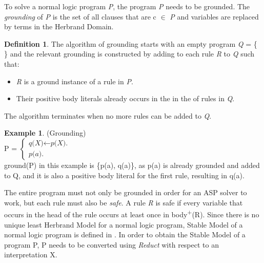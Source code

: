 \documentclass[11pt,twoside]{report}
\theoremstyle{plain}
\theoremstyle{definition}
\newtheorem{defn}[thm]{Definition} %
\newtheorem{examp}{Example}[section]
\begin{document}
To solve a normal logic program \textit{P}, the program \textit{P} needs to be grounded. The \textit{grounding} of \textit{P} is the set of all clauses that are c $\in$ \textit{P} and variables are replaced by terms in the Herbrand Domain.
\begin{defn}
The algorithm of grounding starts with an empty program \textit{Q} = \{  \} and the relevant grounding is constructed by adding to each rule \textit{R} to \textit{Q} such that:
\begin{itemize}
\item \textit{R} is a ground instance of a rule in \textit{P}.
\item Their positive body literals already occurs in the in the of rules in \textit{Q}.
\end{itemize}
The algorithm terminates when no more rules can be added to \textit{Q}.

\end{defn}

\begin{examp} \normalfont (Grounding) \\

P = $\begin{cases}
	\textit{q(X)}  \leftarrow \textit{p(X).} \\
	\textit{p(a).}
      \end{cases}$ \\

ground(P) in this example is \{p(a), q(a)\}, as p(a) is already grounded and added to Q, and it is also a positive body literal for the first rule, resulting in q(a).

\end{examp}
\label{grounding}

The entire program must not only be grounded in order for an ASP solver to work, but each rule must also be \textit{safe}. 
A rule \textit{R} is safe if every variable that occurs in the head of the rule occurs at least once in body\textsuperscript{+}(R).
Since there is no unique least Herbrand Model for a normal logic program, Stable Model of a normal logic program is defined in \cite{Gelfond1988}. 
In order to obtain the Stable Model of a program P, P needs to be converted using \textit{Reduct} with respect to an interpretation X.
\end{document}
